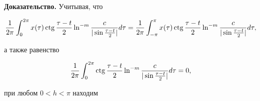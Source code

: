 {\bf Доказательство.} Учитывая, что


$$


\frac{1}{2 \pi} \int_0^{2\pi} x(\tau) \ctg \frac{\tau-t}{2}


\ln^{-m}\frac{c}{|\sin \frac{\tau-t}{2}|} d\tau=


\frac{1}{2 \pi} \int_{- \pi}^{\pi} x(\tau) \ctg \frac{\tau-t}{2}


\ln^{-m}\frac{c}{|\sin \frac{\tau-t}{2}|} d\tau,


$$


а также равенство


$$


\frac{1}{2 \pi} \int_0^{2\pi}\ctg \frac{\tau-t}{2}


\ln^{-m}\frac{c}{|\sin \frac{\tau-t}{2}|} d\tau =0,


$$


при любом $0<h< \pi$ находим



